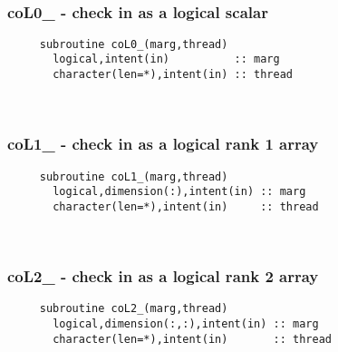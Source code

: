  
\mbox{}\hrulefill\ 
 
  \subsubsection{coL0\_ - check in as a logical scalar}

\begin{verbatim} 
     subroutine coL0_(marg,thread)
       logical,intent(in)          :: marg
       character(len=*),intent(in) :: thread
 \end{verbatim}%
 
 
\mbox{}\hrulefill\ 
 
  \subsubsection{coL1\_ - check in as a logical rank 1 array}

\begin{verbatim} 
     subroutine coL1_(marg,thread)
       logical,dimension(:),intent(in) :: marg
       character(len=*),intent(in)     :: thread
 \end{verbatim}%
 
 
\mbox{}\hrulefill\ 
 
  \subsubsection{coL2\_ - check in as a logical rank 2 array}

\begin{verbatim} 
     subroutine coL2_(marg,thread)
       logical,dimension(:,:),intent(in) :: marg
       character(len=*),intent(in)       :: thread
 \end{verbatim}%
 
